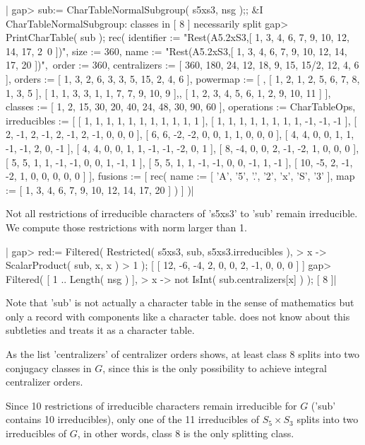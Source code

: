 |    gap> sub:= CharTableNormalSubgroup( s5xs3, nsg );;
    &I CharTableNormalSubgroup: classes in [ 8 ] necessarily split
    gap> PrintCharTable( sub );
    rec( identifier := "Rest(A5.2xS3,[ 1, 3, 4, 6, 7, 9, 10, 12, 14, 17, 2\
    0 ])", size :=
    360, name := "Rest(A5.2xS3,[ 1, 3, 4, 6, 7, 9, 10, 12, 14, 17, 20 ])",\
     order := 360, centralizers := [ 360, 180, 24, 12, 18, 9, 15, 15/2,
      12, 4, 6 ], orders := [ 1, 3, 2, 6, 3, 3, 5, 15, 2, 4, 6
     ], powermap := [ , [ 1, 2, 1, 2, 5, 6, 7, 8, 1, 3, 5 ],
      [ 1, 1, 3, 3, 1, 1, 7, 7, 9, 10, 9 ],,
      [ 1, 2, 3, 4, 5, 6, 1, 2, 9, 10, 11 ] ], classes :=
    [ 1, 2, 15, 30, 20, 40, 24, 48, 30, 90, 60
     ], operations := CharTableOps, irreducibles :=
    [ [ 1, 1, 1, 1, 1, 1, 1, 1, 1, 1, 1 ],
      [ 1, 1, 1, 1, 1, 1, 1, 1, -1, -1, -1 ],
      [ 2, -1, 2, -1, 2, -1, 2, -1, 0, 0, 0 ],
      [ 6, 6, -2, -2, 0, 0, 1, 1, 0, 0, 0 ],
      [ 4, 4, 0, 0, 1, 1, -1, -1, 2, 0, -1 ],
      [ 4, 4, 0, 0, 1, 1, -1, -1, -2, 0, 1 ],
      [ 8, -4, 0, 0, 2, -1, -2, 1, 0, 0, 0 ],
      [ 5, 5, 1, 1, -1, -1, 0, 0, 1, -1, 1 ],
      [ 5, 5, 1, 1, -1, -1, 0, 0, -1, 1, -1 ],
      [ 10, -5, 2, -1, -2, 1, 0, 0, 0, 0, 0 ] ], fusions := [ rec(
          name := [ 'A', '5', '.', '2', 'x', 'S', '3' ],
          map := [ 1, 3, 4, 6, 7, 9, 10, 12, 14, 17, 20 ] ) ] )|

Not all restrictions of irreducible characters of 's5xs3' to 'sub' remain
irreducible.  We compute those restrictions with norm larger than 1.

|    gap> red:= Filtered( Restricted( s5xs3, sub, s5xs3.irreducibles ),
    >                    x -> ScalarProduct( sub, x, x ) > 1 );
    [ [ 12, -6, -4, 2, 0, 0, 2, -1, 0, 0, 0 ] ]
    gap> Filtered( [ 1 .. Length( nsg ) ],
    >              x -> not IsInt( sub.centralizers[x] ) );
    [ 8 ]|

Note that  'sub'  is not  actually  a  character table  in  the sense  of
mathematics  but  only  a  record with components like a character table.
{\GAP} does not know about this subtleties  and  treats it as a character
table.

As the list 'centralizers' of centralizer orders shows,  at least class 8
splits  into  two  conjugacy  classes  in $G$,  since  this  is  the only
possibility to achieve integral centralizer orders.

Since  10 restrictions of  irreducible characters remain  irreducible for
$G$ ('sub' contains 10 irreducibles), only  one of the 11 irreducibles of
$S_5\times S_3$ splits into  two irreducibles  of $G$,  in  other  words,
class 8 is the only splitting class.

